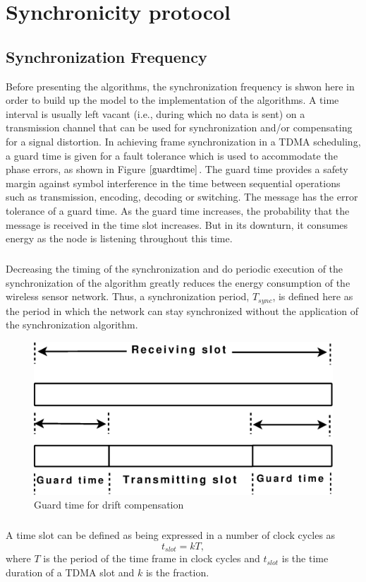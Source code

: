 \documentclass[a4paper,10pt]{report}
\begin{document}
\chapter{\textbf{Synchronicity protocol}}
\section{\textbf{Synchronization Frequency}}\par
Before presenting the algorithms, the synchronization frequency is shwon here in order to build up the model to the implementation of the algorithms. A time interval is usually left vacant (i.e., during which no data is sent) on a transmission channel that can be used for synchronization and/or compensating for a signal distortion. In achieving frame synchronization in a TDMA scheduling, a guard time is given for a fault tolerance which is used to accommodate the phase errors, as shown in Figure $\ref{guardtime}$. The guard time provides a safety margin against symbol interference in the time between sequential operations such as transmission, encoding, decoding or switching. The message has the error tolerance of a guard time. As the guard time increases, the probability that the message is received in the time slot increases. But in its downturn, it consumes energy as the node is listening throughout this time.
\paragraph*{} Decreasing the timing of the synchronization and do periodic execution of the synchronization of the algorithm greatly reduces
the energy consumption of the wireless sensor network. Thus, a synchronization period, $T_{sync}$, is defined here as the period in which the network can stay synchronized without the application of the synchronization algorithm.
\begin{figure}
\centering
\includegraphics[width=0.6 \textwidth]{guardtime}
\caption{Guard time for drift compensation} \label{guardtime}
\end{figure}
\paragraph*{}
A time slot can be defined as being expressed in a number of clock cycles as
\begin{equation}
t_{slot} = kT ,
\end{equation}
where $T$ is the period of the time frame in clock cycles and $t_{slot}$ is the time duration of a TDMA slot and $k$ is the fraction.
\end{document}
